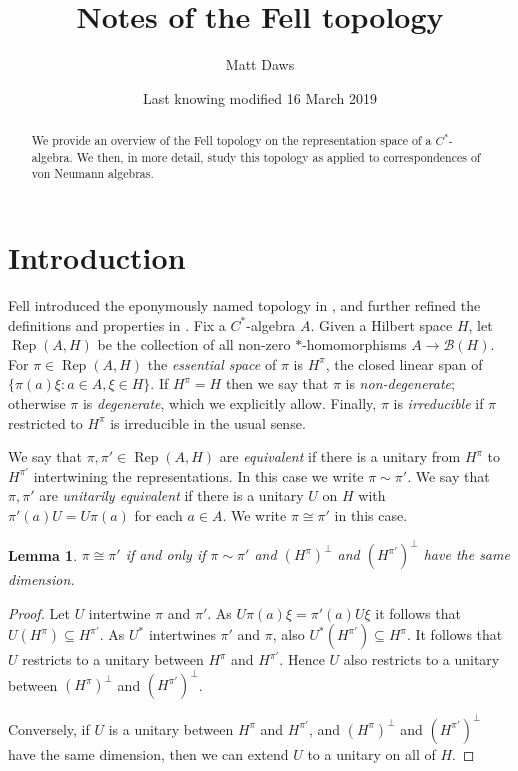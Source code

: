 \documentclass[a4paper,11pt]{article}
\title{Notes of the Fell topology}
\author{Matt Daws}
\date{Last knowing modified 16 March 2019}
\newcommand{\mc}[1]{{\mathcal{#1}}}
\newcommand{\Rep}{\operatorname{Rep}}
\newtheorem{lemma}{Lemma}
\begin{document}
\maketitle

\begin{abstract}
We provide an overview of the Fell topology on the representation space of a
$C^*$-algebra.  We then, in more detail, study this topology as applied to
correspondences of von Neumann algebras.
\end{abstract}

\section{Introduction}

Fell introduced the eponymously named topology in \cite{fell1}, and further
refined the definitions and properties in \cite{fell2}.  Fix a $C^*$-algebra
$A$.  Given a Hilbert space $H$, let $\Rep(A,H)$ be the collection of all
non-zero $*$-homomorphisms $A\rightarrow\mc B(H)$.  For $\pi\in\Rep(A,H)$ the
\emph{essential space} of $\pi$ is $H^\pi$, the closed linear span of
$\{\pi(a)\xi : a\in A, \xi\in H\}$.  If $H^\pi = H$ then we say that $\pi$
is \emph{non-degenerate}; otherwise $\pi$ is \emph{degenerate}, which we
explicitly allow.  Finally, $\pi$ is \emph{irreducible} if $\pi$ restricted
to $H^\pi$ is irreducible in the usual sense.

We say that $\pi,\pi'\in\Rep(A,H)$ are \emph{equivalent} if there is a unitary
from $H^\pi$ to $H^{\pi'}$ intertwining the representations.  In this case we
write $\pi \sim \pi'$. We say that
$\pi,\pi'$ are \emph{unitarily equivalent} if there is a unitary $U$ on $H$
with $\pi'(a) U = U \pi(a)$ for each $a\in A$.  We write $\pi\cong\pi'$ in
this case.

\begin{lemma}
$\pi\cong\pi'$ if and only if $\pi\sim\pi'$ and $(H^\pi)^\perp$ and 
$(H^{\pi'})^\perp$ have the same dimension.
\end{lemma}
\begin{proof}
Let $U$ intertwine $\pi$ and $\pi'$.
As $U\pi(a)\xi = \pi'(a)U\xi$ it follows that $U(H^\pi) \subseteq H^{\pi'}$.
As $U^*$ intertwines $\pi'$ and $\pi$, also $U^*(H^{\pi'}) \subseteq H^\pi$.
It follows that $U$ restricts to a unitary between $H^\pi$ and $H^{\pi'}$.
Hence $U$ also restricts to a unitary between $(H^\pi)^\perp$ and 
$(H^{\pi'})^\perp$.

Conversely, if $U$ is a unitary between $H^\pi$ and $H^{\pi'}$, and
$(H^\pi)^\perp$ and $(H^{\pi'})^\perp$ have the same dimension, then
we can extend $U$ to a unitary on all of $H$.
\end{proof}
\end{document}
